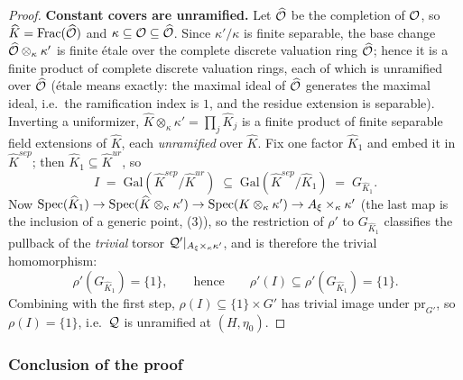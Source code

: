 \begin{proof}
    \textbf{Constant covers are unramified.}
    Let $\widehat{\mathcal{O}}$ be the completion of $\mathcal{O}$, so $\widehat{K} =
    \operatorname{Frac}(\widehat{\mathcal{O}})$ and $\kappa \subseteq \mathcal{O} \subseteq \widehat{\mathcal{O}}$. Since
    $\kappa'/\kappa$ is finite separable, the base change
    $\widehat{\mathcal{O}} \otimes_\kappa \kappa'$ is finite étale over the complete discrete
    valuation ring $\widehat{\mathcal{O}}$; hence it is a finite product of complete discrete
    valuation rings, each of which is unramified over $\widehat{\mathcal{O}}$ (étale means
    exactly: the maximal ideal of $\widehat{\mathcal{O}}$ generates the maximal ideal, i.e.\ the
    ramification index is $1$, and the residue extension is separable). Inverting a
    uniformizer, $\widehat{K} \otimes_\kappa \kappa' = \prod_j \widehat{K}_j$ is a finite
    product of finite separable field extensions of $\widehat{K}$, each \emph{unramified}
    over $\widehat{K}$. Fix one factor $\widehat{K}_1$ and embed it in
    $\widehat{K}^{sep}$; then
    $\widehat{K}_1 \subseteq \widehat{K}^{ur}$, so
    \[
    I \;=\; \mathrm{Gal}(\widehat{K}^{sep}/\widehat{K}^{ur})
      \;\subseteq\; \mathrm{Gal}(\widehat{K}^{sep}/\widehat{K}_1) \;=\; G_{\widehat{K}_1}.
    \]
    Now $\operatorname{Spec}(\widehat{K}_1) \to \operatorname{Spec}(\widehat{K} \otimes_\kappa \kappa') \to
    \operatorname{Spec}(K \otimes_\kappa \kappa') \to A_\xi \times_\kappa \kappa'$ (the last map is the
    inclusion of a generic point, (3)), so the
    restriction of $\rho'$ to $G_{\widehat{K}_1}$ classifies the pullback of the
    \emph{trivial} torsor $\mathcal{Q}'|_{A_\xi \times_\kappa \kappa'}$, and is therefore the
    trivial homomorphism:
    \[
    \rho'\left(G_{\widehat{K}_1}\right) = \{1\}, \qquad\text{hence}\qquad
    \rho'(I) \subseteq \rho'\left(G_{\widehat{K}_1}\right) = \{1\}.
    \]
    Combining with the first step, $\rho(I) \subseteq \{1\} \times G'$ has trivial image
    under $\mathrm{pr}_{G'}$, so $\rho(I) = \{1\}$, i.e.\ $\mathcal{Q}$ is unramified at
    $(H, \eta_0)$.
\end{proof}

\subsubsection*{Conclusion of the proof}

